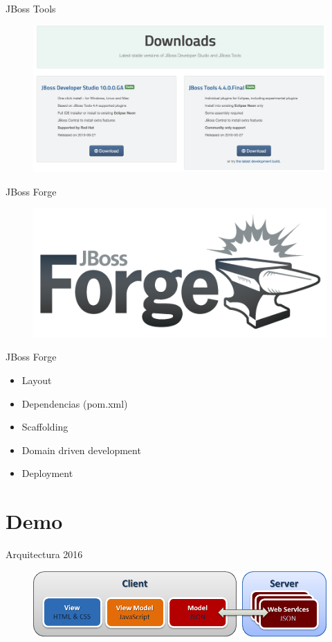 \documentclass{beamer}
\begin{document}
\begin{frame}{JBoss Tools}
	\begin{figure}
		\centering
		\includegraphics[width=0.9\linewidth]{Images/jtools}
	\end{figure}
\end{frame}

\begin{frame}{JBoss Forge}
	\begin{figure}
		\centering
		\includegraphics[width=0.9\linewidth]{Images/forge}
	\end{figure}
\end{frame}

\begin{frame}{JBoss Forge}
	\begin{itemize}
		\item Layout
		\item Dependencias (pom.xml)
		\item Scaffolding
		\item Domain driven development
		\item Deployment
	\end{itemize}
\end{frame}


\section{Demo}
\begin{frame}{Arquitectura 2016}
	\begin{figure}
\centering
\includegraphics[width=0.9\linewidth]{Images/arq2015b}
\end{figure}
\end{frame}
\end{document}
